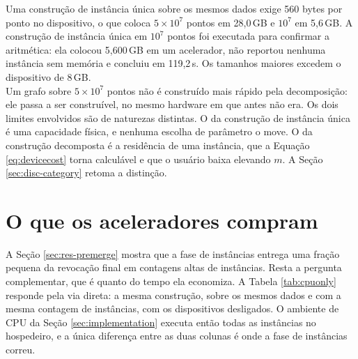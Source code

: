 Uma construção de instância única sobre os mesmos dados exige 560 bytes por ponto no dispositivo, o que coloca $5 \times 10^7$ pontos em 28,0\,GB e $10^7$ em 5,6\,GB. A construção de instância única em $10^7$ pontos foi executada para confirmar a aritmética: ela colocou 5,600\,GB em um acelerador, não reportou nenhuma instância sem memória e concluiu em 119,2\,s. Os tamanhos maiores excedem o dispositivo de 8\,GB.\\

Um grafo sobre $5 \times 10^7$ pontos não é construído mais rápido pela decomposição: ele passa a ser construível, no mesmo hardware em que antes não era. Os dois limites envolvidos são de naturezas distintas. O da construção de instância única é uma capacidade física, e nenhuma escolha de parâmetro o move. O da construção decomposta é a residência de uma instância, que a Equação \eqref{eq:devicecost} torna calculável e que o usuário baixa elevando $m$. A Seção \ref{sec:disc-category} retoma a distinção.\\

\section{O que os aceleradores compram\label{sec:res-cpuonly}}

A Seção \ref{sec:res-premerge} mostra que a fase de instâncias entrega uma fração pequena da revocação final em contagens altas de instâncias. Resta a pergunta complementar, que é quanto do tempo ela economiza. A Tabela \ref{tab:cpuonly} responde pela via direta: a mesma construção, sobre os mesmos dados e com a mesma contagem de instâncias, com os dispositivos desligados. O ambiente de \ac{CPU} da Seção \ref{sec:implementation} executa então todas as instâncias no hospedeiro, e a única diferença entre as duas colunas é onde a fase de instâncias correu.\\

